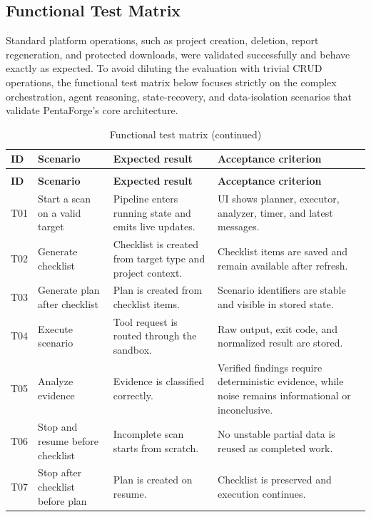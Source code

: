 \documentclass[12pt,a4paper]{report}
\begin{document}
\subsection{Functional Test Matrix}

Standard platform operations, such as project creation, deletion, report regeneration, and protected downloads, were validated successfully and behave exactly as expected. To avoid diluting the evaluation with trivial CRUD operations, the functional test matrix below focuses strictly on the complex orchestration, agent reasoning, state-recovery, and data-isolation scenarios that validate PentaForge's core architecture.

\begin{longtable}{|p{}|p{}|p{}|p{}|}
\caption{Functional test matrix}\label{tab:functional_test_matrix}\\
\hline
\textbf{ID} & \textbf{Scenario} & \textbf{Expected result} & \textbf{Acceptance criterion} \\
\hline
\endfirsthead
\caption[]{Functional test matrix (continued)}\\
\hline
\textbf{ID} & \textbf{Scenario} & \textbf{Expected result} & \textbf{Acceptance criterion} \\
\hline
\endhead
T01 & Start a scan on a valid target & Pipeline enters running state and emits live updates. & UI shows planner, executor, analyzer, timer, and latest messages. \\
\hline
T02 & Generate checklist & Checklist is created from target type and project context. & Checklist items are saved and remain available after refresh. \\
\hline
T03 & Generate plan after checklist & Plan is created from checklist items. & Scenario identifiers are stable and visible in stored state. \\
\hline
T04 & Execute scenario & Tool request is routed through the sandbox. & Raw output, exit code, and normalized result are stored. \\
\hline
T05 & Analyze evidence & Evidence is classified correctly. & Verified findings require deterministic evidence, while noise remains informational or inconclusive. \\
\hline
T06 & Stop and resume before checklist & Incomplete scan starts from scratch. & No unstable partial data is reused as completed work. \\
\hline
T07 & Stop after checklist before plan & Plan is created on resume. & Checklist is preserved and execution continues. \\

\end{longtable}
\end{document}
